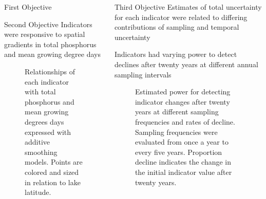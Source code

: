 \documentclass[final,t]{beamer}\usepackage[]{graphicx}\usepackage[]{color}
\begin{document}
\begin{frame}{}
\begin{columns}[t]
\begin{column}{.31\linewidth}
\begin{block}{First Objective}
\end{block}

\begin{block}{Second Objective}
\alert{Indicators were responsive} to spatial gradients in \alert{total phosphorus} and mean \alert{growing degree days}


\begin{figure}
\captionsetup[subfigure]{labelformat=empty}
\subfloat[][]{
  \label{fig:gam_gdd}
}
\vspace{-1.5cm}
\subfloat[][]{
  \label{fig:gam_lntp}
}
\vspace{-1cm}

\caption{\footnotesize Relationships of each indicator with total phosphorus and mean growing degrees days expressed with additive smoothing models.  Points are colored and sized in relation to lake latitude.}
\label{fig:gam}
\end{figure}
\vspace{-1cm}

\end{block}

\end{column}

  \begin{column}{.31\linewidth}

  \begin{block}{Third Objective}
Estimates of \alert{total uncertainty} for each indicator were related to differing contributions of \alert{sampling} and \alert{temporal} uncertainty

  
  \vspace{1cm}
Indicators had \alert{varying power} to detect declines after twenty years at different \alert{annual sampling intervals}


\begin{figure}
\caption{\footnotesize Estimated power for detecting indicator changes after twenty years at different sampling frequencies and rates of decline.  Sampling frequencies were evaluated from once a year to every five years.  Proportion decline indicates the change in the initial indicator value after twenty years.}
\end{figure}	


\end{block}
\end{column}
\end{columns}
\end{frame}
\end{document}
